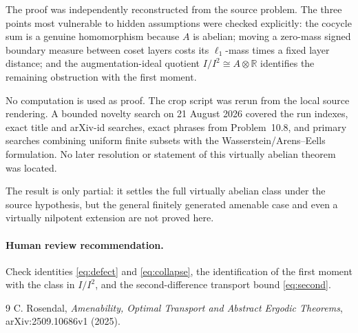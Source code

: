 \documentclass[11pt]{article}
\newcommand{\R}{\mathbb R}
\begin{document}
The proof was independently reconstructed from the source problem.  The
three points most vulnerable to hidden assumptions were checked explicitly:
the cocycle sum is a genuine homomorphism because $A$ is abelian; moving a
zero-mass signed boundary measure between coset layers costs its
$\ell_1$-mass times a fixed layer distance; and the augmentation-ideal
quotient $I/I^2\cong A\otimes\R$ identifies the remaining obstruction with
the first moment.

No computation is used as proof.  The crop script was rerun from the local
source rendering.  A bounded novelty search on 21 August 2026 covered the
run indexes, exact title and arXiv-id searches, exact phrases from
Problem~10.8, and primary searches combining uniform finite subsets with the
Wasserstein/Arens--Eells formulation.  No later resolution or statement of
this virtually abelian theorem was located.

The result is only partial: it settles the full virtually abelian class under
the source hypothesis, but the general finitely generated amenable case and
even a virtually nilpotent extension are not proved here.

\paragraph{Human review recommendation.}
Check identities \eqref{eq:defect} and \eqref{eq:collapse}, the identification
of the first moment with the class in $I/I^2$, and the second-difference
transport bound \eqref{eq:second}.

\begin{thebibliography}{9}
C. Rosendal,
\emph{Amenability, Optimal Transport and Abstract Ergodic Theorems},
arXiv:2509.10686v1 (2025).
\end{thebibliography}
\end{document}
